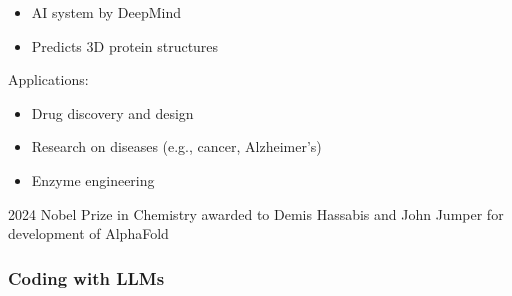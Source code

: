 \begin{frame}

    \begin{itemize}
        \item AI system by DeepMind 
            \vspace{0.5em}
        \item Predicts 3D protein structures
            \vspace{0.5em}
    \end{itemize}


            \vspace{0.5em}
    Applications:

    \begin{itemize}
        \item Drug discovery and design
            \vspace{0.5em}
        \item Research on diseases (e.g., cancer, Alzheimer's)
            \vspace{0.5em}
        \item Enzyme engineering 
    \end{itemize}

            \vspace{0.5em}
            \vspace{0.5em}
    2024 Nobel Prize in Chemistry awarded to Demis Hassabis and John
    Jumper for development of AlphaFold

\end{frame}



\begin{frame}
    \frametitle{Coding with LLMs}
    
    \begin{figure}
       \centering
    \end{figure}

\end{frame}


